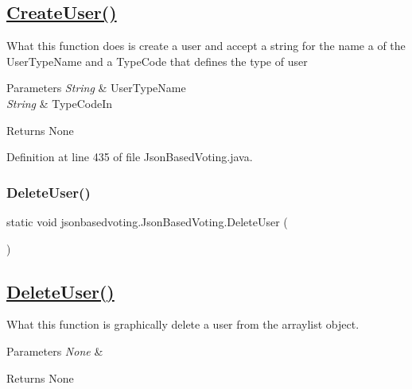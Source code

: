 \subsection*{\mbox{\hyperlink{classjsonbasedvoting_1_1_json_based_voting_ad2f672b45638c0a0767c01bf51c8098a}{Create\+User()}} }

What this function does is create a user and accept a string for the name a of the User\+Type\+Name and a Type\+Code that defines the type of user


\begin{DoxyParams}{Parameters}
{\em String} & User\+Type\+Name \\
\hline
{\em String} & Type\+Code\+In \\
\hline
\end{DoxyParams}
\begin{DoxyReturn}{Returns}
None 
\end{DoxyReturn}


Definition at line 435 of file Json\+Based\+Voting.\+java.

\mbox{\label{classjsonbasedvoting_1_1_json_based_voting_ac203bbbbb46504b4239c28d595e1cdfc}} 
\subsubsection{\texorpdfstring{DeleteUser()}{DeleteUser()}}
{\footnotesize\ttfamily static void jsonbasedvoting.\+Json\+Based\+Voting.\+Delete\+User (\begin{DoxyParamCaption}{ }\end{DoxyParamCaption})\hspace{0.3cm}{\ttfamily [static]}}

\subsection*{\mbox{\hyperlink{classjsonbasedvoting_1_1_json_based_voting_ac203bbbbb46504b4239c28d595e1cdfc}{Delete\+User()}} }

What this function is graphically delete a user from the arraylist object. 
\begin{DoxyParams}{Parameters}
{\em None} & \\
\hline
\end{DoxyParams}
\begin{DoxyReturn}{Returns}
None 
\end{DoxyReturn}


